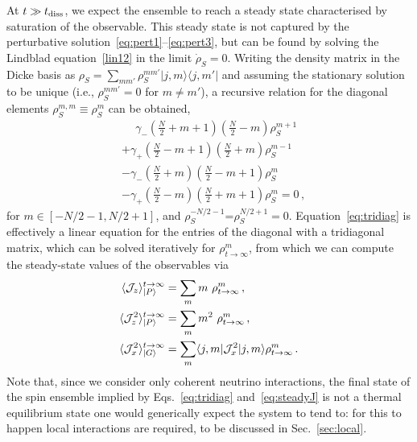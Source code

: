 \documentclass[aps,prd,10pt,twocolumn,superscriptaddress,floatfix,nofootinbib,amsmath,amssymb,altaffilletter,preprintnumbers]{revtex4-1}
\begin{document}
At $t \gg t_{\rm diss}$, we expect the ensemble to reach a steady state characterised by saturation of the observable.  This steady state is not captured by the perturbative solution~\eqref{eq:pert1}--\eqref{eq:pert3}, but can be found by solving the Lindblad equation~\eqref{lin12} in the limit $\dot{\rho}_S=0$. Writing the density matrix in the Dicke basis as $\rho_S = \sum_{mm'}\rho^{mm'}_S\vert j,m\rangle\langle j,m'\vert$ and assuming the stationary solution to be unique (i.e., $\rho^{mm'}_S=0$ for $m\neq m'$), a recursive relation for the diagonal elements $\rho^{m,m}_{S}\equiv\rho^{m}_{S}$ can be obtained,
\begin{equation}
\begin{aligned}
&\quad~\gamma_-\left(\frac{N}{2}+m+1\right)\left(\frac{N}{2}-m \right)\rho_{S}^{m+1}\\
&+\gamma_+\left(\frac{N}{2}-m+1\right)\left(\frac{N}{2}+m\right)\rho_S^{m-1}  \\
&-\gamma_-\left(\frac{N}{2}+m\right)\left(\frac{N}{2}-m+1\right)\rho_S^m \\
&-\gamma_+\left(\frac{N}{2}-m\right)\left(\frac{N}{2}+m+1\right)\rho_S^m=0\,,
\label{eq:tridiag}
\end{aligned}
\end{equation}
for $m\in [-N/2-1, N/2+1]$, and $\rho_S^{-N/2-1}$=$\rho_S^{N/2+1}=0$. Equation~\eqref{eq:tridiag} is effectively a linear equation for the entries of the diagonal with a tridiagonal matrix, which can be solved iteratively for $\rho^{m}_{t\to\infty}$, from which we can compute the steady-state values of the observables via 
\begin{equation}
\begin{aligned}
    \langle {\cal J}_z\rangle_{\vert P\rangle}^{t\to\infty}&=\sum_m m~\rho^m_{t\to\infty}\,,\\
    \langle {\cal J}^2_z\rangle_{\vert P\rangle}^{t\to\infty}&=\sum_m m^2~\rho^m_{t\to\infty}\,,\\
    \langle {\cal J}^2_x\rangle_{\vert G\rangle}^{t\to\infty}&=\sum_m \langle j, m \vert {\cal J}^2_x\vert j ,m\rangle\rho^m_{t\to\infty}\,.
    \label{eq:steadyJ}
\end{aligned}
\end{equation}
Note that, since we consider only coherent neutrino interactions, the final state of the spin ensemble  implied by Eqs.~\eqref{eq:tridiag} and~\eqref{eq:steadyJ} is not a thermal equilibrium state one would generically expect the system to tend to: for this to happen local interactions are required, to be discussed in Sec.~\ref{sec:local}.
\end{document}
